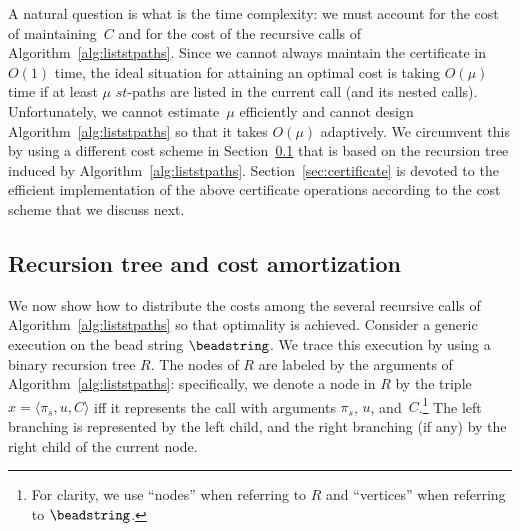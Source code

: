 A natural question is what is the time complexity: we must account for
the cost of maintaining~$C$ and for the cost of the recursive calls of
Algorithm~\ref{alg:liststpaths}. Since we cannot always maintain the
certificate in $O(1)$ time, the ideal situation for attaining an
optimal cost is taking $O(\mu)$ time if at least $\mu$ $st$-paths are
listed in the current call (and its nested calls). Unfortunately, we
cannot estimate~$\mu$ efficiently and cannot design
Algorithm~\ref{alg:liststpaths} so that it takes $O(\mu)$ adaptively.
We circumvent this by using a different cost scheme in
Section~\ref{sub:recursion-tree-cost} that is based on the recursion
tree induced by Algorithm~\ref{alg:liststpaths}.
Section~\ref{sec:certificate} is devoted to the efficient
implementation of the above certificate operations according to the
cost scheme that we discuss next.


\subsection{Recursion tree and cost amortization}
\label{sub:recursion-tree-cost}

We now show how to distribute the costs among the several recursive
calls of Algorithm~\ref{alg:liststpaths} so that optimality is
achieved. Consider a generic execution on the bead string
$\beadstring$. We trace this execution by using a binary recursion
tree $R$. The nodes of $R$ are labeled by the arguments of 
Algorithm~\ref{alg:liststpaths}: specifically, we denote a node
in $R$ by the triple $x = \langle \pi_s, u, C \rangle$ iff it
represents the call with arguments $\pi_s$, $u$, and~$C$.\footnote{For
clarity, we use ``nodes'' when referring to $R$ and ``vertices'' when
referring to $\beadstring$.}  The left branching is represented by the
left child, and the right branching (if any) by the right child of the
current node. 


